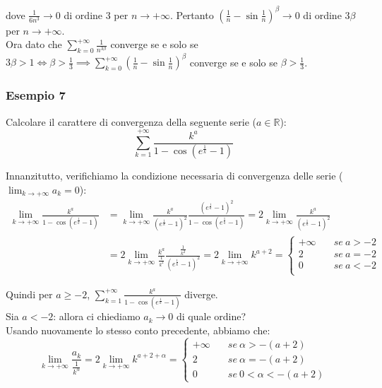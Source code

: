 \documentclass{article}
\begin{document}
\noindent dove $\frac{1}{6n^3} \to 0$ di ordine $3$ per $n \to +\infty$. Pertanto $(\frac{1}{n} - \sin\frac{1}{n})^\beta \to 0$ di ordine $3\beta$ per $n \to +\infty$.\\
Ora dato che $\sum_{k = 0}^{+\infty} \frac{1}{n^{3\beta}}$ converge se e solo se $3\beta > 1 \iff \beta > \frac{1}{3} \implies \sum_{k = 0}^{+\infty} (\frac{1}{n} - \sin\frac{1}{n})^\beta$ converge se e solo se $\beta > \frac{1}{3}$.

\subsubsection{Esempio 7}
Calcolare il carattere di convergenza della seguente serie ($a \in \mathbb{R}$):
\begin{equation*}
    \sum_{k = 1}^{+\infty} \frac{k^a}{1 - \cos(e^\frac{1}{k} - 1)}
\end{equation*}

\noindent Innanzitutto, verifichiamo la condizione necessaria di convergenza delle serie ($\lim_{k \to +\infty} a_k = 0$):
\begin{align*}
    \lim_{k \to +\infty} \frac{k^a}{1 - \cos(e^\frac{1}{k} - 1)} &= \lim_{k \to +\infty} \frac{k^a}{(e^\frac{1}{k} - 1)^2} \frac{(e^\frac{1}{k} - 1)^2}{1 - \cos(e^\frac{1}{k} - 1)} = 2\lim_{k \to +\infty} \frac{k^a}{(e^\frac{1}{k} - 1)^2} \\
    &= 2\lim_{k \to +\infty} \frac{k^a}{\frac{1}{k^2}} \frac{\frac{1}{k^2}}{(e^\frac{1}{k} - 1)^2} = 2 \lim_{k \to +\infty} k^{a + 2} = \begin{cases}
        +\infty & \quad se \ a > - 2\\
        2 & \quad se \ a = - 2\\
        0 & \quad se \ a < - 2\\
    \end{cases}
\end{align*}

\noindent Quindi per $a \geq -2$, $\sum_{k = 1}^{+\infty} \frac{k^a}{1 - \cos(e^\frac{1}{k} - 1)}$ diverge. \\
Sia $a < -2$: allora ci chiediamo $a_k \to 0$ di quale ordine?\\
Usando nuovamente lo stesso conto precedente, abbiamo che:
\begin{equation*}
    \lim_{k \to +\infty} \frac{a_k}{\frac{1}{k^\alpha}} = 2\lim_{k \to +\infty} k^{a + 2 + \alpha} = \begin{cases}
        +\infty & \quad se \ \alpha > - (a + 2) \\
        2 & \quad se \ \alpha = - (a + 2) \\
        0 & \quad se \ 0 < \alpha < - (a + 2)
    \end{cases}
\end{equation*}
\end{document}
